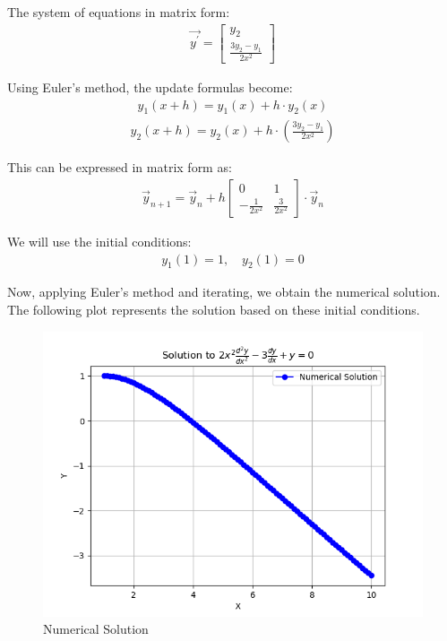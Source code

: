 \documentclass[journal]{IEEEtran}
\begin{document}
The system of equations in matrix form:
\begin{align}
\vec{y^\prime} = \begin{bmatrix} 
y_2 \\ 
\frac{3y_2 - y_1}{2x^2} 
\end{bmatrix}
\end{align}

Using Euler's method, the update formulas become:
\begin{align}
y_1(x+h) = y_1(x) + h \cdot y_2(x)
\end{align}
\begin{align}
y_2(x+h) = y_2(x) + h \cdot \left( \frac{3y_2 - y_1}{2x^2} \right)
\end{align}

This can be expressed in matrix form as:
\begin{align}
    \vec{y}_{n+1} = \vec{y}_n + h \begin{bmatrix}
    0 & 1 \\ 
    -\frac{1}{2x^2} & \frac{3}{2x^2} 
    \end{bmatrix} \cdot \vec{y}_n
\end{align}

We will use the initial conditions:
\begin{align}
y_1(1) = 1, \quad y_2(1) = 0
\end{align}

Now, applying Euler's method and iterating, we obtain the numerical solution. The following plot represents the solution based on these initial conditions.

\begin{figure}[h!]
   \centering
   \includegraphics[width=1\columnwidth]{figs/fig2.png} 
   \caption{Numerical Solution}
   \label{stemplot}
\end{figure}
\end{document}
